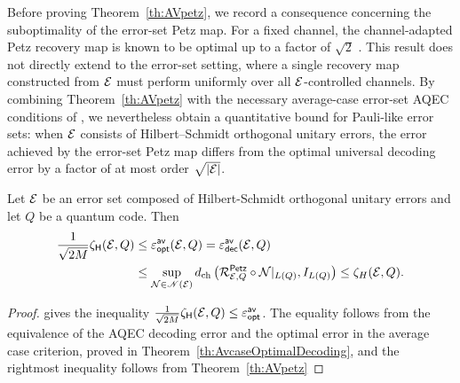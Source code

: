 \documentclass[10pt]{article}
\newcommand{\p}[1]{\left(#1\right)}
\newcommand{\s}[1]{\mathsf{#1}}
\begin{document}
Before proving Theorem~\ref{th:AVpetz}, we record a consequence concerning the suboptimality of the error-set Petz map. For a fixed channel, the channel-adapted Petz recovery map is known to be optimal up to a factor of $\sqrt{2}$ \cite{barnum2002reversing,li2025optimality}. This result does not directly extend to the error-set setting, where a single recovery map constructed from ${\cal E}$ must perform uniformly over all ${\cal E}$-controlled channels. By combining Theorem~\ref{th:AVpetz} with the necessary average-case error-set AQEC conditions of \cite{Elimelech2026Theory}, we nevertheless obtain a quantitative bound for Pauli-like error sets: when ${\cal E}$ consists of Hilbert--Schmidt orthogonal unitary errors, the error achieved by the error-set Petz map differs from the optimal universal decoding error by a factor of at most order $\sqrt{|{\cal E}|}$.
 \begin{cor}Let ${\cal E}$ be an error set composed of Hilbert-Schmidt orthogonal unitary errors and let $Q$ be a quantum code. Then 
  \begin{align*} \frac{1}{\sqrt{2M}}\zeta_{\s{H}}(\calE,Q)&\leq \varepsilon_{\s{opt}}^{\s{av}}(\calE,Q)=\varepsilon_{\s{dec}}^{\s{av}}(\calE,Q)\\
  &\leq \sup_{\calN \in \mathscr{N}(\calE)}d_{\mathrm{ch}}\p{\calR_{\calE,Q}^{\s{\s{Petz}}}\circ \calN|_{L(Q)},I_{L(Q)}}\leq \zeta_{H}(\calE,Q).
  \end{align*}
 \end{cor}
 \begin{proof}
     \cite[Proposition 12]{Elimelech2026Theory} gives the inequality $\frac{1}{\sqrt{2M}}\zeta_{\s{H}}(\calE,Q)\leq \varepsilon_{\s{opt}}^{\s{av}}$.
     The equality follows from the equivalence of the AQEC decoding error and the optimal error in the average case criterion, proved in Theorem~\ref{th:AvcaseOptimalDecoding}, and the rightmost inequality follows from Theorem~\ref{th:AVpetz}
 \end{proof}
\end{document}
